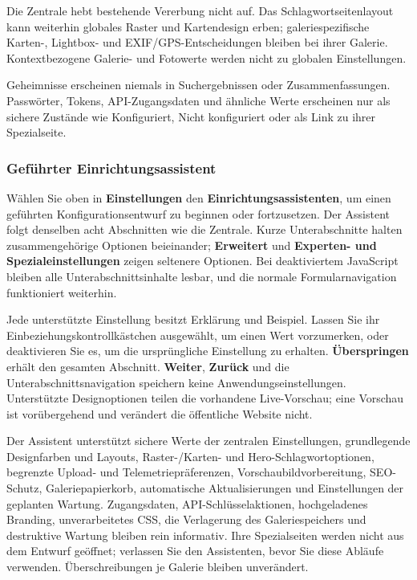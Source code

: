 \documentclass[11pt,a4paper]{article}
\newcommand{\ui}[1]{\textbf{#1}}
\begin{document}
Die Zentrale hebt bestehende Vererbung nicht auf. Das Schlagwortseitenlayout
kann weiterhin globales Raster und Kartendesign erben; galeriespezifische
Karten-, Lightbox- und EXIF/GPS-Entscheidungen bleiben bei ihrer Galerie.
Kontextbezogene Galerie- und Fotowerte werden nicht zu globalen Einstellungen.

Geheimnisse erscheinen niemals in Suchergebnissen oder Zusammenfassungen.
Passwörter, Tokens, API-Zugangsdaten und ähnliche Werte erscheinen nur als
sichere Zustände wie Konfiguriert, Nicht konfiguriert oder als Link zu ihrer
Spezialseite.

\subsubsection{Geführter Einrichtungsassistent}

Wählen Sie oben in \ui{Einstellungen} den \ui{Einrichtungsassistenten}, um einen
geführten Konfigurationsentwurf zu beginnen oder fortzusetzen. Der Assistent
folgt denselben acht Abschnitten wie die Zentrale. Kurze Unterabschnitte halten
zusammengehörige Optionen beieinander; \ui{Erweitert} und \ui{Experten- und
Spezialeinstellungen} zeigen seltenere Optionen. Bei deaktiviertem JavaScript
bleiben alle Unterabschnittsinhalte lesbar, und die normale Formularnavigation
funktioniert weiterhin.

Jede unterstützte Einstellung besitzt Erklärung und Beispiel. Lassen Sie ihr
Einbeziehungskontrollkästchen ausgewählt, um einen Wert vorzumerken, oder
deaktivieren Sie es, um die ursprüngliche Einstellung zu erhalten.
\ui{Überspringen} erhält den gesamten Abschnitt. \ui{Weiter}, \ui{Zurück} und
die Unterabschnittsnavigation speichern keine Anwendungseinstellungen.
Unterstützte Designoptionen teilen die vorhandene Live-Vorschau; eine Vorschau
ist vorübergehend und verändert die öffentliche Website nicht.

Der Assistent unterstützt sichere Werte der zentralen Einstellungen,
grundlegende Designfarben und Layouts, Raster-/Karten- und
Hero-Schlagwortoptionen, begrenzte Upload- und Telemetriepräferenzen,
Vorschaubildvorbereitung, SEO-Schutz, Galeriepapierkorb, automatische
Aktualisierungen und Einstellungen der geplanten Wartung. Zugangsdaten,
API-Schlüsselaktionen, hochgeladenes Branding, unverarbeitetes CSS, die
Verlagerung des Galeriespeichers und destruktive Wartung bleiben rein
informativ. Ihre Spezialseiten werden nicht aus dem Entwurf geöffnet; verlassen
Sie den Assistenten, bevor Sie diese Abläufe verwenden. Überschreibungen je
Galerie bleiben unverändert.
\end{document}

